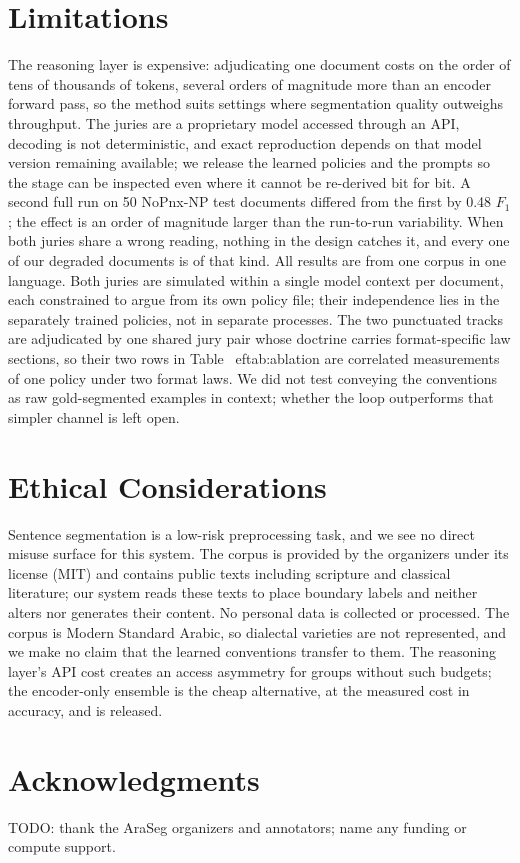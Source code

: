 \documentclass[11pt]{article}
\begin{document}
\section*{Limitations}
The reasoning layer is expensive: adjudicating one document costs on the order of tens
of thousands of tokens, several orders of magnitude more than an encoder forward pass,
so the method suits settings where segmentation quality outweighs throughput. The
juries are a proprietary model accessed through an API, decoding is not deterministic,
and exact reproduction depends on that model version remaining available; we release
the learned policies and the prompts so the stage can be inspected even where it
cannot be re-derived bit for bit. A second full run on 50 NoPnx-NP test documents
differed from the first by 0.48 $F_1$; the effect is an order of magnitude larger than
the run-to-run variability. When both juries share a wrong reading, nothing in the
design catches it, and every one of our degraded documents is of that kind. All
results are from one corpus in one language. Both juries are simulated within a
single model context per document, each constrained to argue from its own policy file;
their independence lies in the separately trained policies, not in separate processes.
The two punctuated tracks are adjudicated by one shared jury pair whose doctrine
carries format-specific law sections, so their two rows in Table~
ef{tab:ablation}
are correlated measurements of one policy under two format laws. We did not test
conveying the conventions as raw gold-segmented examples in context; whether the loop
outperforms that simpler channel is left open.
\section*{Ethical Considerations}
Sentence segmentation is a low-risk preprocessing task, and we see no direct misuse
surface for this system. The corpus is provided by the organizers under its license
(MIT) and contains public texts including scripture and classical literature;
our system reads these texts to place boundary labels and neither alters nor generates
their content. No personal data is collected or processed. The corpus is Modern
Standard Arabic, so dialectal varieties are not represented, and we make no claim that
the learned conventions transfer to them. The reasoning layer's API cost creates an
access asymmetry for groups without such budgets; the encoder-only ensemble is the
cheap alternative, at the measured cost in accuracy, and is released.
\section*{Acknowledgments}
TODO: thank the AraSeg organizers and annotators; name any funding or compute
support. %

\appendix
\end{document}
